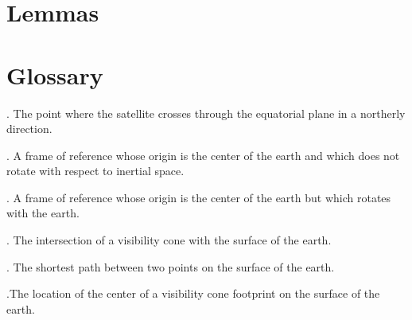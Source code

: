 \documentclass[oneside,12pt]{report}
\begin{document}



\renewcommand{\thefootnote}{\arabic{footnote}}
\setcounter{footnote}{0}


%
%
%
%
%

%
%
%
%
%
%


\appendix
{}

\chapter{Lemmas}\label{Lemma}

\chapter{Glossary}\label{Glossary}

\vspace{12pt} 

\vspace{8pt}
. The point where the satellite crosses through
the equatorial plane in a northerly direction. 

\vspace{8pt}
. A frame of reference whose origin is the center of the earth and which does not rotate with respect to inertial space.

\vspace{8pt}
. A frame of reference whose origin is the center of the earth but which rotates with the earth. 

\vspace{8pt} . The intersection of a visibility cone with the surface of the earth.

\vspace{8pt} . The shortest path between two points on the surface of the earth. 

\vspace{8pt} .The location of the center of a visibility cone footprint on the surface of the earth.
\end{document}
